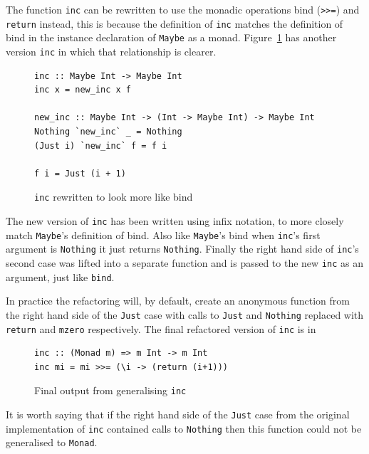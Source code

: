The function \texttt{inc} \DIFaddbegin {}\DIFaddend can be rewritten to use the monadic operations bind (\texttt{>>=}) and \texttt{return} instead, this is because the definition of \texttt{inc} matches the definition of bind in the instance declaration of \texttt{Maybe} as a monad. Figure~\ref{incRewrite} has another version \texttt{inc} in which that relationship is clearer.

\begin{figure}[t]
\begin{lstlisting}
inc :: Maybe Int -> Maybe Int
inc x = new_inc x f

new_inc :: Maybe Int -> (Int -> Maybe Int) -> Maybe Int
Nothing `new_inc` _ = Nothing
(Just i) `new_inc` f = f i

f i = Just (i + 1)
\end{lstlisting}
\caption{\texttt{inc} rewritten to look more like bind}
\label{incRewrite}
\end{figure}

The new version of \texttt{inc} has been written using infix notation, to more closely match \texttt{Maybe}'s definition of bind. Also like \texttt{Maybe}'s bind when \texttt{inc}'s first argument is \texttt{Nothing} it just returns \texttt{Nothing}. Finally the right hand side of \texttt{inc}'s second case was lifted into a separate function and is passed to the new \texttt{inc} as an argument, just like \texttt{bind}.

In practice the refactoring will, by default, create an anonymous function from the right hand side of the \texttt{Just} case with calls to \texttt{Just} and \texttt{Nothing} replaced with \texttt{return} and \texttt{mzero} respectively. The final refactored version of \texttt{inc} is in \DIFdelbegin {}\DIFdelend \DIFaddbegin {}\DIFaddend 

\begin{figure}[t]
\begin{lstlisting}
inc :: (Monad m) => m Int -> m Int
inc mi = mi >>= (\i -> (return (i+1)))
\end{lstlisting}
\caption{Final output from generalising \texttt{inc}}
\label{mmp1Ref}
\end{figure}

It is worth saying that if the right hand side of the \texttt{Just} case from the original implementation of \texttt{inc} contained calls to \texttt{Nothing} then this function could not be generalised to \texttt{Monad}. \DIFdelbegin {}\texttt{} %
\texttt{} %

